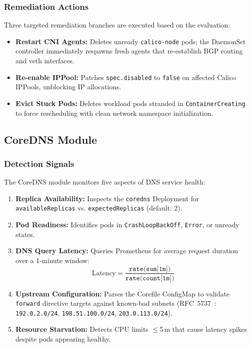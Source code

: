 \documentclass[conference]{IEEEtran}
\begin{document}
\subsubsection{Remediation Actions}
Three targeted remediation branches are executed based on the evaluation:
\begin{itemize}
  \item \textbf{Restart CNI Agents:} Deletes unready \texttt{calico-node} pods; the DaemonSet controller immediately respawns fresh agents that re-establish BGP routing and veth interfaces.
  \item \textbf{Re-enable IPPool:} Patches \texttt{spec.disabled} to \texttt{false} on affected Calico IPPools, unblocking IP allocations.
  \item \textbf{Evict Stuck Pods:} Deletes workload pods stranded in \texttt{ContainerCreating} to force rescheduling with clean network namespace initialization.
\end{itemize}

\subsection{CoreDNS Module}

\subsubsection{Detection Signals}
The CoreDNS module monitors five aspects of DNS service health:
\begin{enumerate}
  \item \textbf{Replica Availability:} Inspects the \texttt{coredns} Deployment for \texttt{availableReplicas} vs. \texttt{expectedReplicas} (default: 2).
  \item \textbf{Pod Readiness:} Identifies pods in \texttt{CrashLoopBackOff}, \texttt{Error}, or unready states.
  \item \textbf{DNS Query Latency:} Queries Prometheus for average request duration over a 1-minute window:
  \begin{equation}
    \text{Latency} = \frac{\texttt{rate(sum[1m])}}{\texttt{rate(count[1m])}}
    \label{eq:latency}
  \end{equation}
  \item \textbf{Upstream Configuration:} Parses the Corefile ConfigMap to validate \texttt{forward} directive targets against known-bad subnets (RFC~5737~\cite{rfc5737}: \texttt{192.0.2.0/24}, \texttt{198.51.100.0/24}, \texttt{203.0.113.0/24}).
  \item \textbf{Resource Starvation:} Detects CPU limits $\leq$5\,m that cause latency spikes despite pods appearing healthy.
\end{enumerate}
\end{document}
